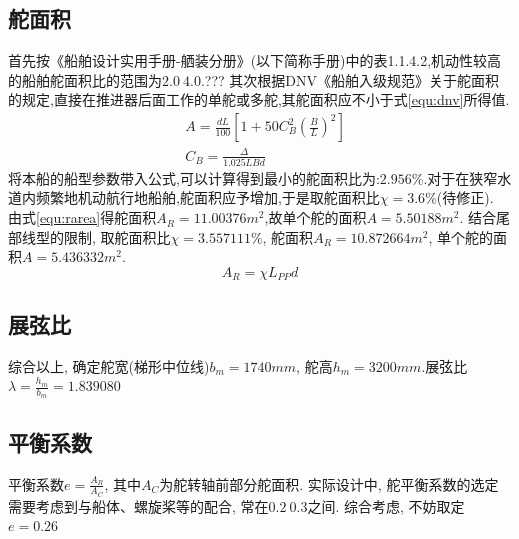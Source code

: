\documentclass[a4paper,UTF8]{article}
\begin{document}
\subsection{舵面积}
首先按《船舶设计实用手册-舾装分册》(以下简称手册)中的表1.1.4.2,机动性较高的船舶舵面积比的范围为$2.0~4.0$.???
其次根据DNV《船舶入级规范》关于舵面积的规定,直接在推进器后面工作的单舵或多舵,其舵面积应不小于式\ref{equ:dnv}所得值.
\begin{equation}\label{equ:dnv}
\begin{split}
&A = \frac{dL}{100}[1+50C^{2}_{B}(\frac{B}{L})^{2}]\\
&C_{B}=\frac{\Delta}{1.025LBd}
\end{split}
\end{equation}
将本船的船型参数带入公式,可以计算得到最小的舵面积比为:$2.956\%$.对于在狭窄水道内频繁地机动航行地船舶,舵面积应予增加,于是取舵面积比$\chi=3.6\%$(待修正). 由式\ref{equ:rarea}得舵面积$A_{R}=11.00376 m^{2}$,故单个舵的面积$A=5.50188 m^{2}$. 结合尾部线型的限制, 取舵面积比$\chi=3.557111\%$, 舵面积$A_{R}=10.872664 m^{2}$, 单个舵的面积$A=5.436332 m^{2}$.
\begin{equation}\label{equ:rarea}
A_{R} = \chi L_{PP}d
\end{equation}

\subsection{展弦比}
综合以上, 确定舵宽(梯形中位线)$b_{m}=1740 mm$, 舵高$h_{m}=3200 mm$.展弦比$\lambda=\frac{h_{m}}{b_{m}}=1.839080$\\

\subsection{平衡系数}
平衡系数$e=\frac{A_{R}}{A_{C}}$, 其中$A_{C}$为舵转轴前部分舵面积. 实际设计中, 舵平衡系数的选定需要考虑到与船体、螺旋桨等的配合, 常在$0.2~0.3$之间. 综合考虑, 不妨取定$e=0.26$
\end{document}
